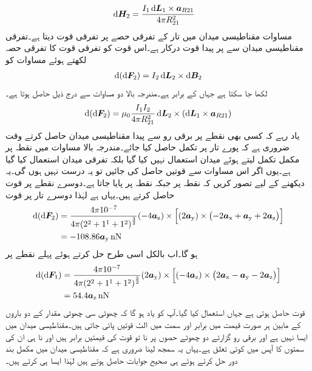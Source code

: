 \begin{align*}
\dif \kvec{H}_2&=\frac{I_1 \dif \kvec{L}_1 \times \kvec{a}_{R21}}{4 \pi R_{21}^2}
\end{align*}
مساوات  مقناطیسی میدان  میں تار کے تفرقی حصے پر تفرقی قوت دیتا ہے۔تفرقی مقناطیسی میدان  سے  پر  پیدا قوت درکار ہے۔اس قوت کو تفرقی قوت کا تفرقی حصہ  لکھتے ہوئے مساوات  کو 
\begin{align*}
\dif \left(\dif \kvec{F}_2 \right)=I_2 \dif \kvec{L}_2 \times \dif \kvec{B}_2
\end{align*}
لکھا جا سکتا ہے جہاں  کے برابر ہے۔مندرجہ بالا دو مساوات سے درج ذیل حاصل ہوتا ہے۔
\begin{align}\label{مساوات_امالہ_تفرقی_تفرقی_قوت}
\dif \left(\dif \kvec{F}_2 \right)=\mu_0 \frac{I_1 I_2}{4\pi R_{21}^2} \dif \kvec{L}_2 \times \left(\dif \kvec{L}_1 \times \kvec{a}_{R21} \right)
\end{align}
یاد رہے کہ کسی بھی نقطے پر برقی رو سے پیدا مقناطیسی میدان حاصل کرتے وقت ضروری ہے کہ پورے تار پر تکمل حاصل کیا جائے۔مندرجہ بالا مساوات میں نقطہ  پر مکمل تکمل لیتے ہوئے میدان  استعمال نہیں کیا گیا بلکہ تفرقی میدان  استعمال کیا گیا ہے۔یوں اگر اس مساوات سے قوتیں حاصل کی جائیں تو یہ درست نہیں ہوں گی۔یہ دیکھنے کے لیے تصور کریں کہ نقطہ  پر  جبکہ نقطہ  پر  پایا جاتا ہے۔دوسرے نقطے پر قوت حاصل کرتے ہیں۔یہاں  ہے لہٰذا دوسرے تار پر قوت
\begin{align*}
\dif \left(\dif \kvec{F}_2 \right)&= \frac{4 \pi 10^{-7}}{4\pi {\left(2^2+1^1+1^2\right)}^\frac{3}{2}} (-4\az) \times \left[(2\ay) \times \left( -2\ax+\ay+2\az \right) \right]\\
&=-108.86 \ay \, \si{\nano \newton}
\end{align*}
ہو گا۔اب بالکل اسی طرح حل کرتے ہوئے پہلے نقطے پر
\begin{align*}
\dif \left(\dif \kvec{F}_1 \right)&= \frac{4 \pi 10^{-7}}{4\pi {\left(2^2+1^1+1^2\right)}^\frac{3}{2}} (2\ay)  \times \left[(-4\az)\times \left( 2\ax-\ay-2\az \right) \right]\\
&=54.4 \az \, \si{\nano \newton}
\end{align*}
 قوت حاصل ہوتی ہے جہاں  استعمال کیا گیا۔آپ کو یاد ہو گا کہ  چھوٹی سی چھوٹی مقدار کے دو باروں کے مابین ہر صورت قیمت میں برابر اور سمت میں الٹ قوتیں پائی جاتی ہیں۔مقناطیسی میدان میں ایسا نہیں ہے اور برقی رو گزارتے دو چھوٹے حصوں پر نا تو قوت کی قیمتیں برابر ہیں اور نا ہی ان کی سمتوں کا آپس میں کوئی تعلق ہے۔یہاں یہ سمجھ لینا ضروری ہے کہ مقناطیسی میدان میں مکمل بند دور حل کرتے ہوئے ہی صحیح جوابات حاصل ہوتے ہیں لہٰذا ایسا ہی کرتے ہیں۔

